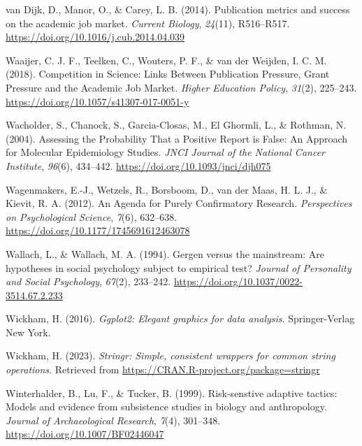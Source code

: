 \documentclass[
  ,man,mask,floatsintext]{apa6}
\newlength{\cslhangindent}
\newlength{\cslentryspacingunit} %
\newenvironment{CSLReferences}[2] %
 {%
  \setlength{\parindent}{0pt}
  \ifodd #1
  \let\oldpar\par
  \def\par{\hangindent=\cslhangindent\oldpar}
  \fi
  \setlength{\parskip}{#2\cslentryspacingunit}
 }%
 {}
\begin{document}
\begin{CSLReferences}{1}{0}
\leavevmode{}%
van Dijk, D., Manor, O., \& Carey, L. B. (2014). Publication metrics and success on the academic job market. \emph{Current Biology}, \emph{24}(11), R516--R517. \url{https://doi.org/10.1016/j.cub.2014.04.039}

\leavevmode{}%
Waaijer, C. J. F., Teelken, C., Wouters, P. F., \& van der Weijden, I. C. M. (2018). Competition in {Science}: {Links Between Publication Pressure}, {Grant Pressure} and the {Academic Job Market}. \emph{Higher Education Policy}, \emph{31}(2), 225--243. \url{https://doi.org/10.1057/s41307-017-0051-y}

\leavevmode{}%
Wacholder, S., Chanock, S., Garcia-Closas, M., El Ghormli, L., \& Rothman, N. (2004). Assessing the {Probability That} a {Positive Report} is {False}: {An Approach} for {Molecular Epidemiology Studies}. \emph{JNCI Journal of the National Cancer Institute}, \emph{96}(6), 434--442. \url{https://doi.org/10.1093/jnci/djh075}

\leavevmode{}%
Wagenmakers, E.-J., Wetzels, R., Borsboom, D., van der Maas, H. L. J., \& Kievit, R. A. (2012). An {Agenda} for {Purely Confirmatory Research}. \emph{Perspectives on Psychological Science}, \emph{7}(6), 632--638. \url{https://doi.org/10.1177/1745691612463078}

\leavevmode{}%
Wallach, L., \& Wallach, M. A. (1994). Gergen versus the mainstream: {Are} hypotheses in social psychology subject to empirical test? \emph{Journal of Personality and Social Psychology}, \emph{67}(2), 233--242. \url{https://doi.org/10.1037/0022-3514.67.2.233}

\leavevmode{}%
Wickham, H. (2016). \emph{Ggplot2: {Elegant} graphics for data analysis}. Springer-Verlag New York.

\leavevmode{}%
Wickham, H. (2023). \emph{Stringr: Simple, consistent wrappers for common string operations}. Retrieved from \url{https://CRAN.R-project.org/package=stringr}

\leavevmode{}%
Winterhalder, B., Lu, F., \& Tucker, B. (1999). Risk-senstive adaptive tactics: {Models} and evidence from subsistence studies in biology and anthropology. \emph{Journal of Archaeological Research}, \emph{7}(4), 301--348. \url{https://doi.org/10.1007/BF02446047}


\end{CSLReferences}
\end{document}
